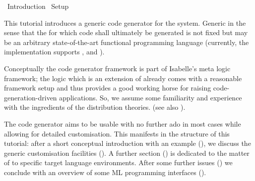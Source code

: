 %
\begin{isabellebody}%
\def\isabellecontext{Introduction}%
%
\isadelimtheory
%
\endisadelimtheory
%
\isatagtheory
{}\isamarkupfalse%
\ Introduction\isanewline
{}\ Setup\isanewline
{}%
\endisatagtheory
{\isafoldtheory}%
%
\isadelimtheory
%
\endisadelimtheory
%
\isamarkuptrue%
%
\isamarkuptrue%
%
\begin{isamarkuptext}%
This tutorial introduces a generic code generator for the
   system.
  Generic in the sense that the
   for which code shall ultimately be
  generated is not fixed but may be an arbitrary state-of-the-art
  functional programming language (currently, the implementation
  supports  \cite{SML},  \cite{OCaml} and 
  \cite{haskell-revised-report}).

  Conceptually the code generator framework is part
  of Isabelle's \hyperlink{theory.Pure}{\mbox{}} meta logic framework; the logic
  \hyperlink{theory.HOL}{\mbox{}} which is an extension of \hyperlink{theory.Pure}{\mbox{}}
  already comes with a reasonable framework setup and thus provides
  a good working horse for raising code-generation-driven
  applications.  So, we assume some familiarity and experience
  with the ingredients of the \hyperlink{theory.HOL}{\mbox{}} distribution theories.
  (see also \cite{isa-tutorial}).

  The code generator aims to be usable with no further ado
  in most cases while allowing for detailed customisation.
  This manifests in the structure of this tutorial: after a short
  conceptual introduction with an example (),
  we discuss the generic customisation facilities ().
  A further section () is dedicated to the matter of
   to specific target language environments.  After some
  further issues () we conclude with an overview
  of some ML programming interfaces ().


\end{isamarkuptext}
\end{isabellebody}
